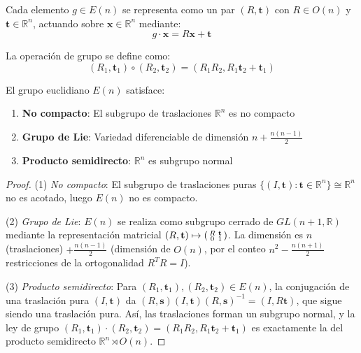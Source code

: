 Cada elemento $g \in E(n)$ se representa como un par $(R, \mathbf{t})$ con $R \in O(n)$ y $\mathbf{t} \in \mathbb{R}^n$, actuando sobre $\mathbf{x} \in \mathbb{R}^n$ mediante:
\begin{equation}
g \cdot \mathbf{x} = R\mathbf{x} + \mathbf{t}
\end{equation}

La operación de grupo se define como:
\begin{equation}
(R_1, \mathbf{t}_1) \circ (R_2, \mathbf{t}_2) = (R_1 R_2, R_1 \mathbf{t}_2 + \mathbf{t}_1)
\end{equation}

\begin{proposition}[Propiedades de $E(n)$]
El grupo euclidiano $E(n)$ satisface:
\begin{enumerate}
    \item \textbf{No compacto}: El subgrupo de traslaciones $\mathbb{R}^n$ es no compacto
    \item \textbf{Grupo de Lie}: Variedad diferenciable de dimensión $n + \frac{n(n-1)}{2}$
    \item \textbf{Producto semidirecto}: $\mathbb{R}^n$ es subgrupo normal
\end{enumerate}
\end{proposition}

\begin{proof}
(1) \textit{No compacto}: El subgrupo de traslaciones puras $\{(I, \mathbf{t}) : \mathbf{t} \in \mathbb{R}^n\} \cong \mathbb{R}^n$ no es acotado, luego $E(n)$ no es compacto.

(2) \textit{Grupo de Lie}: $E(n)$ se realiza como subgrupo cerrado de $GL(n+1, \mathbb{R})$ mediante la representación matricial $(R, \mathbf{t}) \mapsto \begin{psmallmatrix} R & \mathbf{t} \\ 0 & 1 \end{psmallmatrix}$. La dimensión es $n$ (traslaciones) $+ \frac{n(n-1)}{2}$ (dimensión de $O(n)$, por el conteo $n^2 - \frac{n(n+1)}{2}$ restricciones de la ortogonalidad $R^TR = I$).

(3) \textit{Producto semidirecto}: Para $(R_1, \mathbf{t}_1), (R_2, \mathbf{t}_2) \in E(n)$, la conjugación de una traslación pura $(I, \mathbf{t})$ da $(R, \mathbf{s})(I, \mathbf{t})(R, \mathbf{s})^{-1} = (I, R\mathbf{t})$, que sigue siendo una traslación pura. Así, las traslaciones forman un subgrupo normal, y la ley de grupo $(R_1, \mathbf{t}_1) \cdot (R_2, \mathbf{t}_2) = (R_1 R_2, R_1 \mathbf{t}_2 + \mathbf{t}_1)$ es exactamente la del producto semidirecto $\mathbb{R}^n \rtimes O(n)$.
\end{proof}

